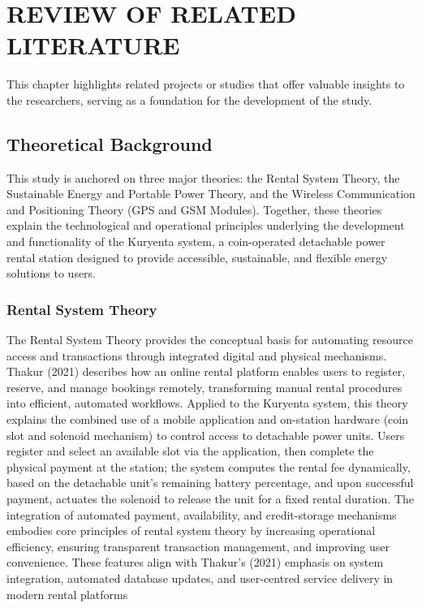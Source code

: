 \chapter{REVIEW OF RELATED LITERATURE}
{\baselineskip
This chapter highlights related projects or studies that offer valuable insights to the researchers, serving as a foundation for the development of the study.


\section{Theoretical Background}

This study is anchored on three major theories: the Rental System Theory, the Sustainable Energy and Portable Power Theory, and the Wireless Communication and Positioning Theory (GPS and GSM Modules). Together, these theories explain the technological and operational principles underlying the development and functionality of the Kuryenta system, a coin-operated detachable power rental station designed to provide accessible, sustainable, and flexible energy solutions to users.

\subsection{Rental System Theory}
The Rental System Theory provides the conceptual basis for automating resource access and transactions through integrated digital and physical mechanisms. Thakur (2021) describes how an online rental platform enables users to register, reserve, and manage bookings remotely, transforming manual rental procedures into efficient, automated workflows. Applied to the Kuryenta system, this theory explains the combined use of a mobile application and on-station hardware (coin slot and solenoid mechanism) to control access to detachable power units. Users register and select an available slot via the application, then complete the physical payment at the station; the system computes the rental fee dynamically, based on the detachable unit’s remaining battery percentage, and upon successful payment, actuates the solenoid to release the unit for a fixed rental duration. The integration of automated payment, availability, and credit-storage mechanisms embodies core principles of rental system theory by increasing operational efficiency, ensuring transparent transaction management, and improving user convenience. These features align with Thakur’s (2021) emphasis on system integration, automated database updates, and user-centred service delivery in modern rental platforms

}
